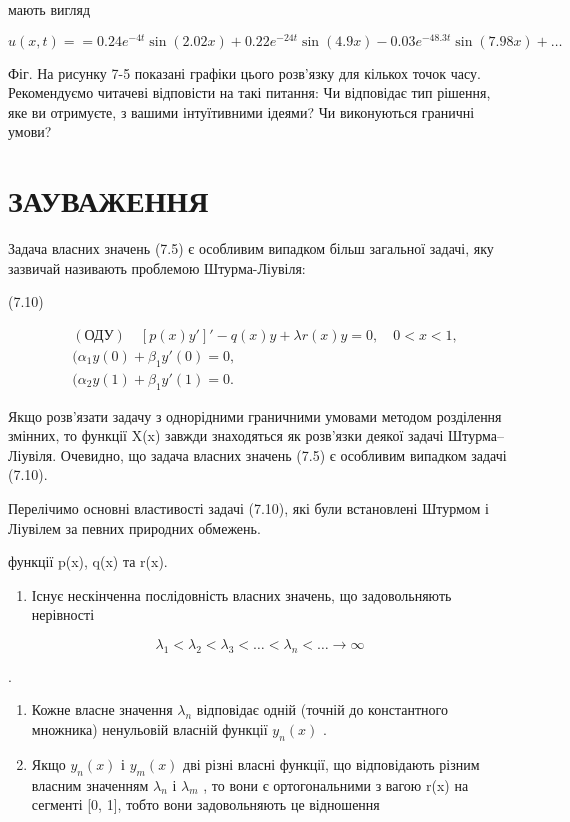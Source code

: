 \documentclass[
  ukrainian,
]{article}
\providecommand{\tightlist}{%
  \setlength{\itemsep}{0pt}\setlength{\parskip}{0pt}}
\begin{document}
мають вигляд

\[
u(x, t) = = 0.24e^{-4t} \sin(2.02x) + 0.22e^{-24t} \sin(4.9x) - 0.03e^{-48.3t} \sin(7.98x) + \dots
\]

Фіг. На рисунку 7-5 показані графіки цього розв'язку для кількох точок
часу. Рекомендуємо читачеві відповісти на такі питання: Чи відповідає
тип рішення, яке ви отримуєте, з вашими інтуїтивними ідеями? Чи
виконуються граничні умови?

\section{ЗАУВАЖЕННЯ}\label{ux437ux430ux443ux432ux430ux436ux435ux43dux43dux44f-3}

Задача власних значень (7.5) є особливим випадком більш загальної
задачі, яку зазвичай називають проблемою Штурма-Ліувіля:

(7.10)

\[
\begin{aligned} & (\text{ОДУ}) \quad [p(x)y']' - q(x)y + \lambda r(x)y = 0, \quad 0 < x < 1, \\ & (\alpha_1 y(0) + \beta_1 y'(0) = 0, \\ & (\alpha_2 y(1) + \beta_1 y'(1) = 0. \end{aligned}
\]

Якщо розв'язати задачу з однорідними граничними умовами методом
розділення змінних, то функції X(x) завжди знаходяться як розв'язки
деякої задачі Штурма--Ліувіля. Очевидно, що задача власних значень (7.5)
є особливим випадком задачі (7.10).

Перелічимо основні властивості задачі (7.10), які були встановлені
Штурмом і Ліувілем за певних природних обмежень.

функції p(x), q(x) та r(x).

\begin{enumerate}
\def\labelenumi{\arabic{enumi}.}
\tightlist
\item
  Існує нескінченна послідовність власних значень, що задовольняють
  нерівності
\end{enumerate}

\[
\lambda_1 < \lambda_2 < \lambda_3 < \ldots < \lambda_n < \ldots \to \infty
\]

.

\begin{enumerate}
\def\labelenumi{\arabic{enumi}.}
\setcounter{enumi}{1}
\item
  Кожне власне значення \(\lambda_n\) відповідає одній (точній до
  константного множника) ненульовій власній функції \(y_n(x)\) .
\item
  Якщо \(y_n(x)\) і \(y_m(x)\) дві різні власні функції, що відповідають
  різним власним значенням \(\lambda_n\) і \(\lambda_m\) , то вони є
  ортогональними з вагою r(x) на сегменті {[}0, 1{]}, тобто вони
  задовольняють це відношення
\end{enumerate}
\end{document}
